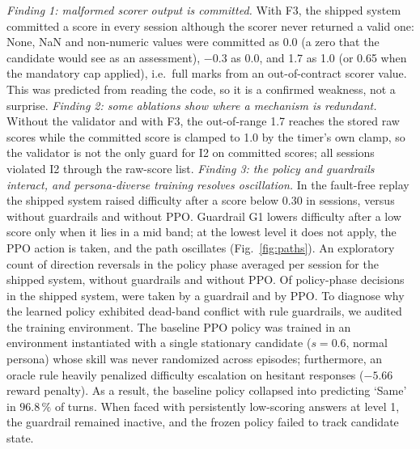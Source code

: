 \documentclass[runningheads]{llncs}
\begin{document}
\emph{Finding 1: malformed scorer output is committed.} With F3, the shipped system committed a score in every session although the scorer never returned a valid one: None, NaN and non-numeric values were committed as 0.0 (a zero that the candidate would see as an assessment), $-0.3$ as 0.0, and 1.7 as 1.0 (or 0.65 when the mandatory cap applied), i.e.\ full marks from an out-of-contract scorer value. This was predicted from reading the code, so it is a confirmed weakness, not a surprise. \emph{Finding 2: some ablations show where a mechanism is redundant.} Without the validator and with F3, the out-of-range 1.7 reaches the stored raw scores while the committed score is clamped to 1.0 by the timer's own clamp, so the validator is not the only guard for I2 on committed scores; all \fIIIVoneIIsess{} sessions violated I2 through the raw-score list. \emph{Finding 3: the policy and guardrails interact, and persona-diverse training resolves oscillation.} In the fault-free replay the shipped system raised difficulty after a score below 0.30 in \sevenSessVZero{} sessions, versus \sevenSessVTwo{} without guardrails and \sevenSessVThree{} without PPO. Guardrail G1 lowers difficulty after a low score only when it lies in a mid band; at the lowest level it does not apply, the PPO action is taken, and the path oscillates (Fig.~\ref{fig:paths}). An exploratory count of direction reversals in the policy phase averaged \revVZero{} per session for the shipped system, \revVTwo{} without guardrails and \revVThree{} without PPO. Of \srcVzeroN{} policy-phase decisions in the shipped system, \srcVzeroG{} were taken by a guardrail and \srcVzeroPPO{} by PPO.
To diagnose why the learned policy exhibited dead-band conflict with rule guardrails, we audited the training environment. The baseline PPO policy was trained in an environment instantiated with a single stationary candidate ($s=0.6$, normal persona) whose skill was never randomized across episodes; furthermore, an oracle rule heavily penalized difficulty escalation on hesitant responses ($-5.66$ reward penalty). As a result, the baseline policy collapsed into predicting `Same' in $96.8\,\%$ of turns. When faced with persistently low-scoring answers at level 1, the guardrail remained inactive, and the frozen policy failed to track candidate state.
\end{document}
